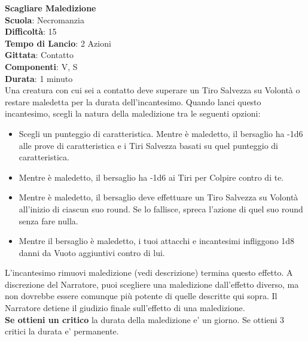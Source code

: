 \begin{multicols}{2}
\medskip\textbf{Scagliare Maledizione}\\
\textbf{Scuola}: Necromanzia\\
\textbf{Difficoltà}: 15\\
\textbf{Tempo di Lancio}: 2 Azioni\\
\textbf{Gittata}: Contatto\\
\textbf{Componenti}: V, S\\
\textbf{Durata}: 1 minuto\\
Una creatura con cui sei a contatto deve superare un Tiro Salvezza su Volontà o restare maledetta per la durata dell'incantesimo. Quando lanci questo incantesimo, scegli la natura della maledizione tra le seguenti opzioni:
\medskip
\begin{itemize}
\item
Scegli un punteggio di caratteristica. Mentre è maledetto, il bersaglio ha -1d6 alle prove di
caratteristica e i Tiri Salvezza basati su quel punteggio di caratteristica.
\item
Mentre è maledetto, il bersaglio ha -1d6 ai Tiri per Colpire contro di te.
\item
Mentre è maledetto, il bersaglio deve effettuare un Tiro Salvezza su Volontà all'inizio di ciascun suo round. Se lo fallisce, spreca l'azione di quel suo round senza fare nulla.
\item
Mentre il bersaglio è maledetto, i tuoi attacchi e incantesimi infliggono 1d8 danni da Vuoto aggiuntivi contro di lui.
\end{itemize}
\medskip
L'incantesimo rimuovi maledizione (vedi descrizione) termina questo effetto. A discrezione del Narratore, puoi scegliere una maledizione dall'effetto diverso, ma non dovrebbe essere comunque più potente di quelle descritte qui sopra. Il Narratore detiene il giudizio finale sull'effetto di una maledizione.\\
\textbf{Se ottieni un critico} la durata della maledizione e' un giorno. Se ottieni 3 critici la durata e' permanente.


\end{multicols}
